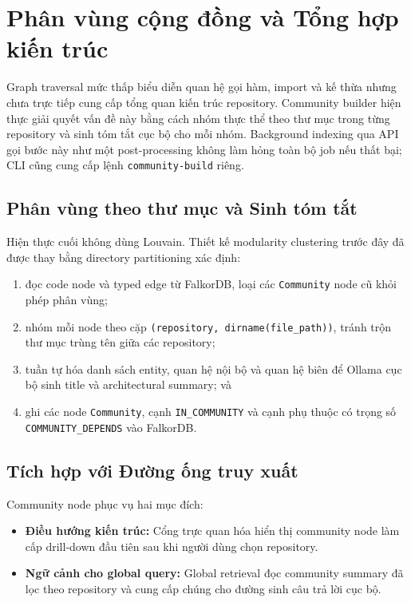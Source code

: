 \documentclass[12pt,a4paper,oneside]{report}
\begin{document}
\section{Phân vùng cộng đồng và Tổng hợp kiến trúc}
\label{sec:community_detection}
Graph traversal mức thấp biểu diễn quan hệ gọi hàm, import và kế thừa nhưng chưa trực tiếp cung cấp tổng quan kiến trúc repository. Community builder hiện thực giải quyết vấn đề này bằng cách nhóm thực thể theo thư mục trong từng repository và sinh tóm tắt cục bộ cho mỗi nhóm. Background indexing qua API gọi bước này như một post-processing không làm hỏng toàn bộ job nếu thất bại; CLI cũng cung cấp lệnh \texttt{community-build} riêng.

\subsection{Phân vùng theo thư mục và Sinh tóm tắt}
Hiện thực cuối không dùng Louvain. Thiết kế modularity clustering trước đây đã được thay bằng directory partitioning xác định:
\begin{enumerate}
    \item đọc code node và typed edge từ FalkorDB, loại các \texttt{Community} node cũ khỏi phép phân vùng;
    \item nhóm mỗi node theo cặp \texttt{(repository, dirname(file\_path))}, tránh trộn thư mục trùng tên giữa các repository;
    \item tuần tự hóa danh sách entity, quan hệ nội bộ và quan hệ biên để Ollama cục bộ sinh title và architectural summary; và
    \item ghi các node \texttt{Community}, cạnh \texttt{IN\_COMMUNITY} và cạnh phụ thuộc có trọng số \texttt{COMMUNITY\_DEPENDS} vào FalkorDB.
\end{enumerate}

\subsection{Tích hợp với Đường ống truy xuất}
Community node phục vụ hai mục đích:
\begin{itemize}
    \item \textbf{Điều hướng kiến trúc:} Cổng trực quan hóa hiển thị community node làm cấp drill-down đầu tiên sau khi người dùng chọn repository.
    \item \textbf{Ngữ cảnh cho global query:} Global retrieval đọc community summary đã lọc theo repository và cung cấp chúng cho đường sinh câu trả lời cục bộ.
\end{itemize}
\end{document}
